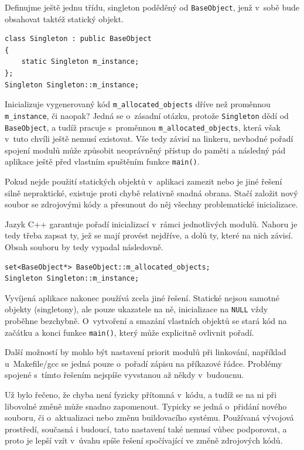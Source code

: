 \documentclass[11pt,twoside,a4paper]{book}
\begin{document}
Definujme ještě jednu třídu, singleton poděděný od \texttt{BaseObject}, jenž v~sobě bude obsahovat taktéž statický objekt.

\begin{verbatim}
class Singleton : public BaseObject
{
    static Singleton m_instance;
};
Singleton Singleton::m_instance;
\end{verbatim}

Inicializuje vygenerovaný kód \texttt{m\_allocated\_objects} dříve než proměnnou \texttt{m\_in\-stan\-ce}, či naopak? Jedná se o~zásadní otázku, protože \texttt{Singleton} dědí od \texttt{BaseObject}, a tudíž pracuje s~proměnnou \texttt{m\_allocated\_objects}, která však v~tuto chvíli ještě nemusí existovat. Vše tedy závisí na linkeru, nevhodné pořadí spojení modulů může způsobit neoprávněný přístup do paměti a následný pád aplikace ještě před vlastním spuštěním funkce \texttt{main()}.

Pokud nejde použití statických objektů v~aplikaci zamezit nebo je jiné řešení silně nepraktické, existuje proti chybě relativně snadná obrana. Stačí založit nový soubor se zdrojovými kódy a přesunout do něj všechny problematické inicializace.

Jazyk C++ garantuje pořadí inicializací v~rámci jednotlivých modulů. Nahoru je tedy třeba zapsat ty, jež se mají provést nejdříve, a dolů ty, které na nich závisí. Obsah souboru by tedy vypadal následovně.

\begin{verbatim}
set<BaseObject*> BaseObject::m_allocated_objects;
Singleton Singleton::m_instance;
\end{verbatim}

Vyvíjená aplikace nakonec používá zcela jiné řešení. Statické nejsou samotné objekty (singletony), ale pouze ukazatele na ně, inicializace na \texttt{NULL} vždy proběhne bezchybně. O~vytvoření a smazání vlastních objektů se stará kód na začátku a konci funkce \texttt{main()}, který může explicitně ovlivnit pořadí.

Další možností by mohlo být nastavení priorit modulů při linkování, například u~Makefile/gcc se jedná pouze o~pořadí zápisu na příkazové řádce. Problémy spojené s~tímto řešením nejspíše vyvstanou až někdy v~budoucnu.

Už bylo řečeno, že chyba není fyzicky přítomná v~kódu, a tudíž se na ni při libovolné změně může snadno zapomenout. Typicky se jedná o~přidání nového souboru, či o~aktualizaci nebo změnu buildovacího systému. Používaná vývojová prostředí, současná i budoucí, tato nastavení také nemusí vůbec podporovat, a proto je lepší vzít v~úvahu spíše řešení spočívající ve změně zdrojových kódů.
\end{document}
